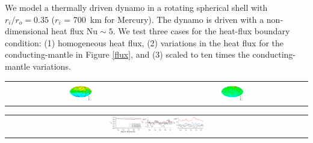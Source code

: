 \documentclass[landscape,a0b,final]{a0poster}
\begin{document}
\begin{multicols}{3}
We model a thermally driven dynamo in a rotating spherical shell with $r_{i}/r_{o} =
0.35$ ($r_i$ = 700~km for Mercury).  The dynamo is driven with a non-dimensional heat flux
$\mathrm{Nu} \sim 5$.  We test three cases for the heat-flux boundary condition: (1)
homogeneous heat flux, (2) variations in the heat flux for the conducting-mantle in
Figure \ref{flux}, and (3) scaled to ten times the conducting-mantle variations.
\begin{center}
\begin{tabular}{cc}
 \includegraphics[width=0.16\textwidth]{br_cmb_x0.png} &
 \includegraphics[width=0.16\textwidth]{br_cmb_x10.png}
\end{tabular}
\label{dynamo}
\end{center}

\begin{center}
\begin{tabular}{c}
 \includegraphics[width=0.32\textwidth]{coeff_flat.png} 
\end{tabular}
\label{gauss}
\end{center}



\end{multicols}
\end{document}
